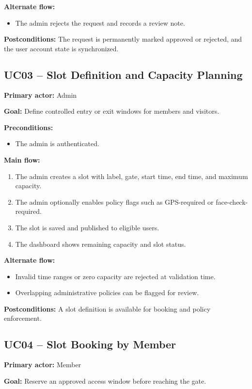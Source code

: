 \documentclass[12pt,letterpaper]{article}
\begin{document}
\textbf{Alternate flow:}
\begin{itemize}
    \item The admin rejects the request and records a review note.
\end{itemize}

\textbf{Postconditions:} The request is permanently marked approved or rejected, and the user account state is synchronized.

\subsection{UC03 -- Slot Definition and Capacity Planning}
\textbf{Primary actor:} Admin

\textbf{Goal:} Define controlled entry or exit windows for members and visitors.

\textbf{Preconditions:}
\begin{itemize}
    \item The admin is authenticated.
\end{itemize}

\textbf{Main flow:}
\begin{enumerate}
    \item The admin creates a slot with label, gate, start time, end time, and maximum capacity.
    \item The admin optionally enables policy flags such as GPS-required or face-check-required.
    \item The slot is saved and published to eligible users.
    \item The dashboard shows remaining capacity and slot status.
\end{enumerate}

\textbf{Alternate flow:}
\begin{itemize}
    \item Invalid time ranges or zero capacity are rejected at validation time.
    \item Overlapping administrative policies can be flagged for review.
\end{itemize}

\textbf{Postconditions:} A slot definition is available for booking and policy enforcement.

\subsection{UC04 -- Slot Booking by Member}
\textbf{Primary actor:} Member

\textbf{Goal:} Reserve an approved access window before reaching the gate.
\end{document}
